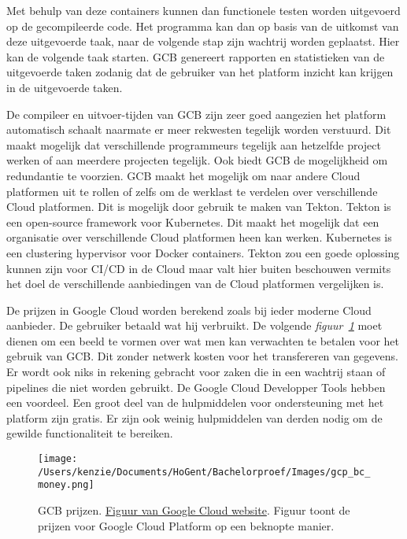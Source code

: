 Met behulp van deze containers kunnen dan functionele testen worden uitgevoerd op de gecompileerde code. Het programma kan dan op basis van de uitkomst van deze uitgevoerde taak, naar de volgende stap zijn wachtrij worden geplaatst. Hier kan de volgende taak starten. GCB genereert rapporten en statistieken van de uitgevoerde taken zodanig dat de gebruiker van het platform inzicht kan krijgen in de uitgevoerde taken.

De compileer en uitvoer-tijden van GCB zijn zeer goed aangezien het platform automatisch schaalt naarmate er meer rekwesten tegelijk worden verstuurd. Dit maakt mogelijk dat verschillende programmeurs tegelijk aan hetzelfde project werken of aan meerdere projecten tegelijk. Ook biedt GCB de mogelijkheid om redundantie te voorzien. GCB maakt het mogelijk om naar andere Cloud platformen uit te rollen of zelfs om de werklast te verdelen over verschillende Cloud platformen. Dit is mogelijk door gebruik te maken van Tekton. Tekton is een open-source framework voor Kubernetes. Dit maakt het mogelijk dat een organisatie over verschillende Cloud platformen heen kan werken. Kubernetes is een clustering hypervisor voor Docker containers. Tekton zou een goede oplossing kunnen zijn voor CI/CD in de Cloud maar valt hier buiten beschouwen vermits het doel de verschillende aanbiedingen van de Cloud platformen vergelijken is.

De prijzen in Google Cloud worden berekend zoals bij ieder moderne Cloud aanbieder. De gebruiker betaald wat hij verbruikt. De volgende \emph{figuur~\ref{fig:GCP_BC_money}} moet dienen om een beeld te vormen over wat men kan verwachten te betalen voor het gebruik van GCB. Dit zonder netwerk kosten voor het transfereren van gegevens. Er wordt ook niks in rekening gebracht voor zaken die in een wachtrij staan of pipelines die niet worden gebruikt. De Google Cloud Developper Tools hebben een voordeel. Een groot deel van de hulpmiddelen voor ondersteuning met het platform zijn gratis. Er zijn ook weinig hulpmiddelen van derden nodig om de gewilde functionaliteit te bereiken.

\begin{figure}[!htbp]
    \centering
    \texttt{[image: /Users/kenzie/Documents/HoGent/Bachelorproef/Images/gcp\_bc\_money.png]}
    \caption{GCB prijzen. \href{https://cloud.google.com/cloud-build/pricing}{Figuur van Google Cloud website}. Figuur toont de prijzen voor Google Cloud Platform op een beknopte manier.}
    \label{fig:GCP_BC_money}
\end{figure}

